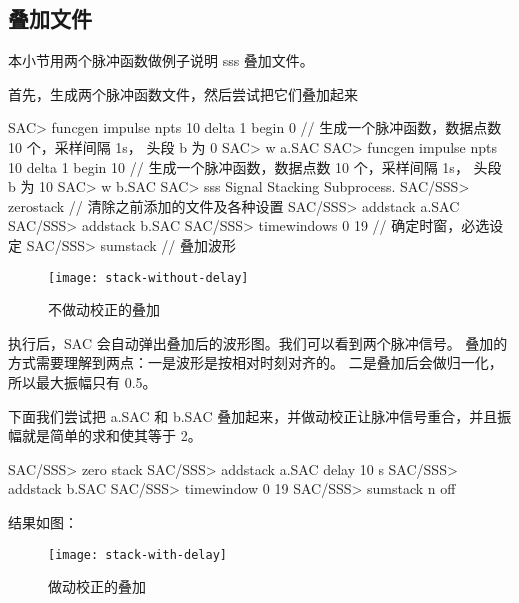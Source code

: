 \subsection{叠加文件}

本小节用两个脉冲函数做例子说明 sss 叠加文件。

首先，生成两个脉冲函数文件，然后尝试把它们叠加起来

\begin{SACCode}
SAC> funcgen impulse npts 10 delta 1 begin 0
// 生成一个脉冲函数，数据点数 10 个，采样间隔 1s， 头段 b 为 0
SAC> w a.SAC
SAC> funcgen impulse npts 10 delta 1 begin 10
// 生成一个脉冲函数，数据点数 10 个，采样间隔 1s， 头段 b 为 10
SAC> w b.SAC
SAC> sss
 Signal Stacking Subprocess.
SAC/SSS> zerostack         // 清除之前添加的文件及各种设置
SAC/SSS> addstack a.SAC
SAC/SSS> addstack b.SAC
SAC/SSS> timewindows 0 19    // 确定时窗，必选设定
SAC/SSS> sumstack    // 叠加波形
\end{SACCode}

\begin{figure}[H]
\centering
\texttt{[image: stack-without-delay]}
\caption{不做动校正的叠加}
\label{fig:stack-without-delay}
\end{figure}

执行后，SAC 会自动弹出叠加后的波形图。我们可以看到两个脉冲信号。
叠加的方式需要理解到两点：一是波形是按相对时刻对齐的。
二是叠加后会做归一化，所以最大振幅只有 0.5。

下面我们尝试把 a.SAC 和 b.SAC 叠加起来，并做动校正让脉冲信号重合，并且振幅就是简单的求和使其等于 2。

\begin{SACCode}
SAC/SSS> zero stack
SAC/SSS> addstack a.SAC delay 10 s
SAC/SSS> addstack b.SAC
SAC/SSS> timewindow 0 19
SAC/SSS> sumstack n off
\end{SACCode}

结果如图：

\begin{figure}[H]
\centering
\texttt{[image: stack-with-delay]}
\caption{做动校正的叠加}
\label{fig:stack-with-delay}
\end{figure}
